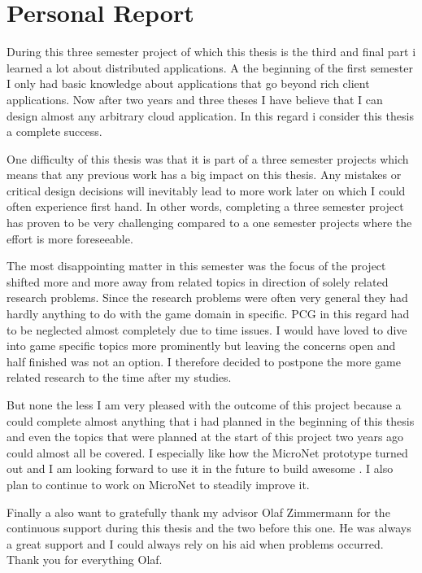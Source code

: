 \chapter{Personal Report}

During this three semester project of which this thesis is the third and final
part i learned a lot about distributed applications. A the beginning of the
first semester I only had basic knowledge about applications that go beyond rich
client applications. Now after two years and three theses I have believe that I
can design almost any arbitrary cloud application. In this regard i consider
this thesis a complete success.

One difficulty of this thesis was that it is part of a three semester projects
which means that any previous work has a big impact on this thesis. Any mistakes
or critical design decisions will inevitably lead to more work later on which I
could often experience first hand. In other words, completing a three semester
project has proven to be very challenging compared to a one semester projects
where the effort is more foreseeable.

The most disappointing matter in this semester was the focus of the project
shifted more and more away from \og{} related topics in direction of solely
\ms{} related research problems. Since the research problems were often very
general they had hardly anything to do with the game domain in specific. PCG in
this regard had to be neglected almost completely due to time issues. I would
have loved to dive into game specific topics more prominently but leaving the
\ms{} concerns open and half finished was not an option. I therefore decided to
postpone the more game related research to the time after my studies.

But none the less I am very pleased with the outcome of this project because a
could complete almost anything that i had planned in the beginning of this
thesis and even the topics that were planned at the start of this project two
years ago could almost all be covered. I especially like how the MicroNet
prototype turned out and I am looking forward to use it in the future to build
awesome \ogs{}. I also plan to continue to work on MicroNet to steadily improve
it.

Finally a also want to gratefully thank my advisor Olaf Zimmermann for the
continuous support during this thesis and the two before this one. He was always
a great support and I could always rely on his aid when problems occurred. Thank
you for everything Olaf. 
